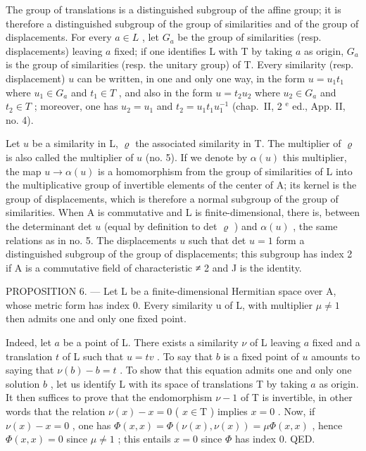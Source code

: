 The group of translations is a distinguished subgroup of the affine group; it is therefore a distinguished subgroup of the group of similarities and of the group of displacements. For every \(a \in L\) , let \(G_a\) be the group of similarities (resp. displacements) leaving \(a\) fixed; if one identifies L with T by taking \(a\) as origin, \(G_a\) is the group of similarities (resp. the unitary group) of T. Every similarity (resp. displacement) \(u\) can be written, in one and only one way, in the form \(u = u_1 t_1\) where \(u_1 \in G_a\) and \(t_1 \in T\) , and also in the form \(u = t_2 u_2\) where \(u_2 \in G_a\) and \(t_2 \in T\) ; moreover, one has \(u_2 = u_1\) and \(t_2 = u_1 t_1 u_1^{-1}\) (chap.~II, 2 \(^\text{e}\) ed., App. II, no. 4).

Let \(u\) be a similarity in L, \(\varrho\) the associated similarity in T. The multiplier of \(\varrho\) is also called the multiplier of \(u\) (no. 5). If we denote by \(\alpha(u)\) this multiplier, the map \(u \to \alpha(u)\) is a homomorphism from the group of similarities of L into the multiplicative group of invertible elements of the center of A; its kernel is the group of displacements, which is therefore a normal subgroup of the group of similarities. When A is commutative and L is finite-dimensional, there is, between the determinant det \(u\) (equal by definition to det \(\varrho\) ) and \(\alpha(u)\) , the same relations as in no. 5. The displacements \(u\) such that det \(u = 1\) form a distinguished subgroup of the group of displacements; this subgroup has index 2 if A is a commutative field of characteristic ≠ 2 and J is the identity.

PROPOSITION 6. --- Let L be a finite-dimensional Hermitian space over A, whose metric form has index 0. Every similarity u of L, with multiplier \(\mu \neq 1\) then admits one and only one fixed point.

Indeed, let \(a\) be a point of L. There exists a similarity \(\nu\) of L leaving \(a\) fixed and a translation \(t\) of L such that \(u = tv\) . To say that \(b\) is a fixed point of \(u\) amounts to saying that \(\nu(b) - b = t\) . To show that this equation admits one and only one solution \(b\) , let us identify L with its space of translations T by taking \(a\) as origin. It then suffices to prove that the endomorphism \(\nu - 1\) of T is invertible, in other words that the relation \(\nu(x) - x = 0\) ( \(x \in \mathrm{T}\) ) implies \(x = 0\) . Now, if \(\nu(x) - x = 0\) , one has \(\Phi(x, x) = \Phi(\nu(x), \nu(x)) = \mu \Phi(x, x)\) , hence \(\Phi(x, x) = 0\) since \(\mu \neq 1\) ; this entails \(x = 0\) since \(\Phi\) has index 0. QED.


